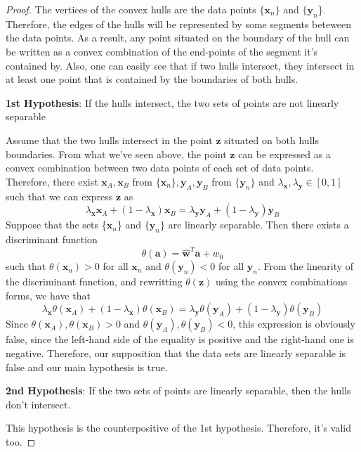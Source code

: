 \begin{proof}
    The vertices of the convex hulls are the data points $\{\mathbf{x}_n\}$ and $\{\mathbf{y}_n$\}. 
    Therefore, the edges of the hulls will be represented by some segments beteween the data points.
    As a result, any point situated on the boundary of the hull can be written as a convex
    combination of the end-points of the segment it's contained by. Also,
    one can easily see that if two hulls intersect, they intersect in at least one 
    point that is contained by the boundaries of both hulls. 

    \vspace{1em}
    \textbf{1st Hypothesis}: If the hulls intersect, the two sets of 
    points are not linearly separable
    \vspace{1em}

    Assume that the two hulls intersect in the point $\mathbf{z}$ situated
    on both hulls boundaries. From what we've seen above, 
    the point $\mathbf{z}$ can be expressed as a convex
    combination between two data points of each set of data points. Therefore,
    there exist 
    $\mathbf{x}_A, \mathbf{x}_B$ from $\{\mathbf{x}_n\}, \mathbf{y}_A, \mathbf{y}_B$
    from $\{\mathbf{y}_n\}$ and $\lambda_\mathbf{x}, \lambda_\mathbf{y} \in [0, 1]$ such that
    we can express $\mathbf{z}$ as
     \[
         \lambda_\mathbf{x} \mathbf{x}_A + (1 - \lambda_\mathbf{x}) \mathbf{x}_B = 
         \lambda_\mathbf{y} \mathbf{y}_A + (1 - \lambda_\mathbf{y}) \mathbf{y}_B
    \] 
    Suppose that the sets \{$\mathbf{x}_n$\} and $\{\mathbf{y}_n\}$ are linearly 
    separable. Then there exists a discriminant function
    \[
        \theta(\mathbf{a}) = \widehat{\mathbf{w}}^T \mathbf{a} + w_0
    \]
    such that $\theta(\mathbf{x}_n) > 0$ for all $\mathbf{x}_n$ and $\theta(\mathbf{y}_n) < 0$
    for all $\mathbf{y}_n$. From the linearity of the discriminant function, 
    and rewritting $\theta(\mathbf{z})$ using the convex combinations forms,
    we have that
    \[
        \lambda_\mathbf{x} \theta(\mathbf{x}_A) + (1 - \lambda_\mathbf{x}) \theta(\mathbf{x}_B)
        = \lambda_\mathbf{y} \theta(\mathbf{y}_A) + (1 - \lambda_\mathbf{y}) \theta(\mathbf{y}_B)
    \] 
    Since $\theta(\mathbf{x}_A), \theta(\mathbf{x}_B) > 0$ and 
    $\theta(\mathbf{y}_A), \theta(\mathbf{y}_B) < 0$, this
    expression is obviously false, since the left-hand side of the equality
    is positive and the right-hand one is negative. Therefore, our supposition
    that the data sets are linearly separable is false and our main hypothesis is true.

    \vspace{1em}
    \textbf{2nd Hypothesis}: If the two sets of points are linearly separable,
    then the hulls don't intersect. 
    \vspace{0.25em}

    This hypothesis is the counterpositive of the 1st hypothesis. Therefore,
    it's valid too.
\end{proof}

